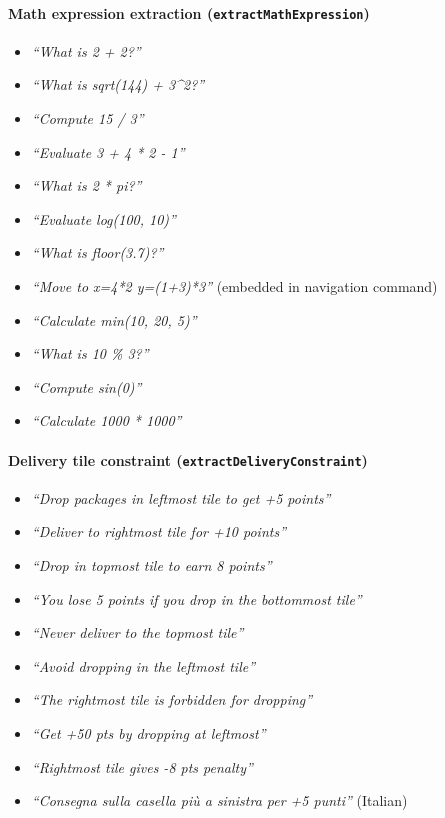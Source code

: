 \paragraph{Math expression extraction (\texttt{extractMathExpression})}
\begin{itemize}
  \item \textit{``What is 2 + 2?''}
  \item \textit{``What is sqrt(144) + 3\^{}2?''}
  \item \textit{``Compute 15 / 3''}
  \item \textit{``Evaluate 3 + 4 * 2 - 1''}
  \item \textit{``What is 2 * pi?''}
  \item \textit{``Evaluate log(100, 10)''}
  \item \textit{``What is floor(3.7)?''}
  \item \textit{``Move to x=4*2 y=(1+3)*3''} \quad (embedded in navigation command)
  \item \textit{``Calculate min(10, 20, 5)''}
  \item \textit{``What is 10 \% 3?''}
  \item \textit{``Compute sin(0)''}
  \item \textit{``Calculate 1000 * 1000''}
\end{itemize}

\paragraph{Delivery tile constraint (\texttt{extractDeliveryConstraint})}
\begin{itemize}
  \item \textit{``Drop packages in leftmost tile to get +5 points''}
  \item \textit{``Deliver to rightmost tile for +10 points''}
  \item \textit{``Drop in topmost tile to earn 8 points''}
  \item \textit{``You lose 5 points if you drop in the bottommost tile''}
  \item \textit{``Never deliver to the topmost tile''}
  \item \textit{``Avoid dropping in the leftmost tile''}
  \item \textit{``The rightmost tile is forbidden for dropping''}
  \item \textit{``Get +50 pts by dropping at leftmost''}
  \item \textit{``Rightmost tile gives -8 pts penalty''}
  \item \textit{``Consegna sulla casella più a sinistra per +5 punti''} \quad (Italian)
\end{itemize}

